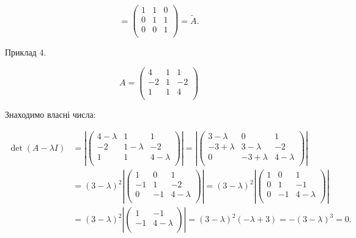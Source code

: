$$= \begin{pmatrix}
	1 & 1 & 0 \\
	0 & 1 & 1 \\
	0 & 0 & 1 \\
\end{pmatrix} = \tilde{A}.$$

Приклад 4.

$$A = \begin{pmatrix}
	4  & 1 & 1  \\
	-2 & 1 & -2 \\
	1  & 1 & 4  \\
\end{pmatrix} $$

Знаходимо власні числа:

\begin{equation*}
    \begin{split}
        \det(A-\lambda I)
        & = \left| \begin{pmatrix}
        	4 - \lambda & 1           & 1 \\
        	-2          & 1 - \lambda & -2 \\
        	1           & 1           & 4 -\lambda \\
        \end{pmatrix} \right|
        = \left| \begin{pmatrix}
        	3 - \lambda & 0           & 1 \\
        	-3 +\lambda & 3 - \lambda & -2 \\
        	0           & -3 +\lambda & 4 -\lambda \\
        \end{pmatrix} \right|\\
        & = (3 - \lambda)^2 \left| \begin{pmatrix}
        	1  & 0  & 1 \\
        	-1 & 1  & -2 \\
        	0  & -1 & 4 -\lambda \\
        \end{pmatrix} \right|
        = (3 - \lambda)^2 \left| \begin{pmatrix}
        	1 & 0  & 1 \\
        	0 & 1  & -1 \\
        	0 & -1 & 4 -\lambda \\
        \end{pmatrix} \right|\\
        & = (3 - \lambda)^2 \left| \begin{pmatrix}
        	1  & -1 \\
        	-1 & 4 -\lambda \\
        \end{pmatrix} \right|
        = (3 - \lambda)^2(-\lambda + 3)
        = -(3 - \lambda)^3 = 0.
    \end{split}
\end{equation*}

